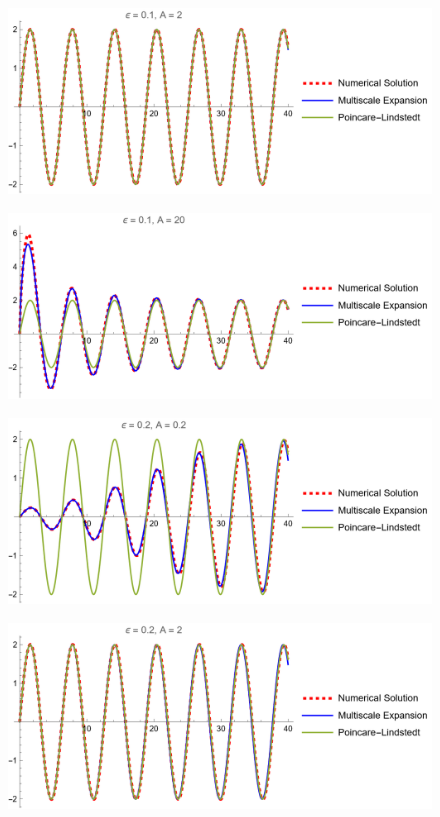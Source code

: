 \documentclass[12pt]{report}
\begin{document}
\begin{solution}
\begin{enumerate}
\begin{figure}[H]
        \end{figure}
        \begin{figure}[H]
            \center
            \includegraphics[width=.8\textwidth]{plots/2c5.png}
        \end{figure}
        \begin{figure}[H]
            \center
            \includegraphics[width=.8\textwidth]{plots/2c6.png}
        \end{figure}
        \begin{figure}[H]
            \center
            \includegraphics[width=.8\textwidth]{plots/2c7.png}
        \end{figure}
        \begin{figure}[H]
            \center
            \includegraphics[width=.8\textwidth]{plots/2c8.png}

\end{figure}
\end{enumerate}
\end{solution}
\end{document}
